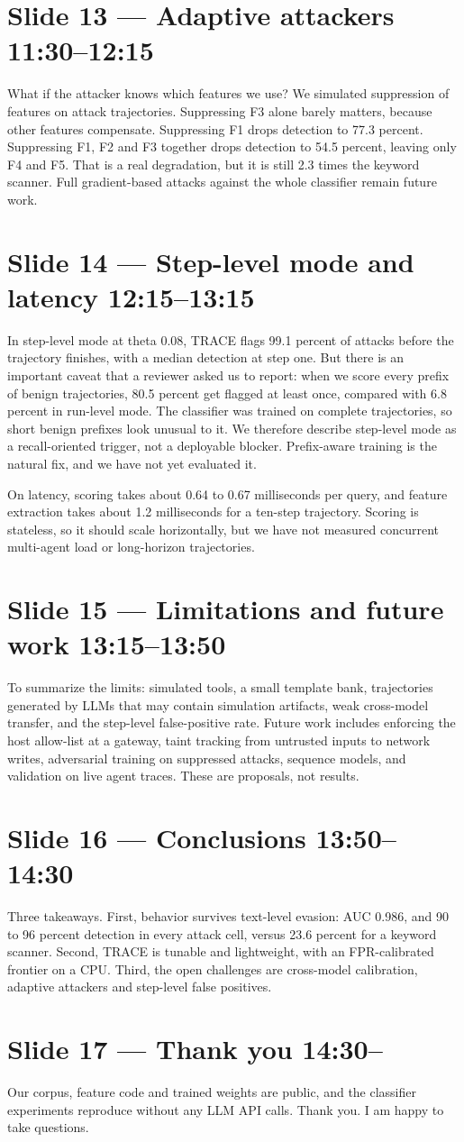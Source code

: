 \documentclass[11pt]{article}
\newcommand{\slide}[3]{\section*{Slide #1 --- #2 \hfill {\normalsize\color{gray}#3}}}
\begin{document}
\slide{13}{Adaptive attackers}{11:30--12:15}
What if the attacker knows which features we use? We simulated suppression of features on attack trajectories. Suppressing F3 alone barely matters, because other features compensate. Suppressing F1 drops detection to 77.3 percent. Suppressing F1, F2 and F3 together drops detection to 54.5 percent, leaving only F4 and F5. That is a real degradation, but it is still 2.3 times the keyword scanner. Full gradient-based attacks against the whole classifier remain future work.

\slide{14}{Step-level mode and latency}{12:15--13:15}
In step-level mode at theta 0.08, TRACE flags 99.1 percent of attacks before the trajectory finishes, with a median detection at step one. But there is an important caveat that a reviewer asked us to report: when we score every prefix of benign trajectories, 80.5 percent get flagged at least once, compared with 6.8 percent in run-level mode. The classifier was trained on complete trajectories, so short benign prefixes look unusual to it. We therefore describe step-level mode as a recall-oriented trigger, not a deployable blocker. Prefix-aware training is the natural fix, and we have not yet evaluated it.

On latency, scoring takes about 0.64 to 0.67 milliseconds per query, and feature extraction takes about 1.2 milliseconds for a ten-step trajectory. Scoring is stateless, so it should scale horizontally, but we have not measured concurrent multi-agent load or long-horizon trajectories.

\slide{15}{Limitations and future work}{13:15--13:50}
To summarize the limits: simulated tools, a small template bank, trajectories generated by LLMs that may contain simulation artifacts, weak cross-model transfer, and the step-level false-positive rate. Future work includes enforcing the host allow-list at a gateway, taint tracking from untrusted inputs to network writes, adversarial training on suppressed attacks, sequence models, and validation on live agent traces. These are proposals, not results.

\slide{16}{Conclusions}{13:50--14:30}
Three takeaways. First, behavior survives text-level evasion: AUC 0.986, and 90 to 96 percent detection in every attack cell, versus 23.6 percent for a keyword scanner. Second, TRACE is tunable and lightweight, with an FPR-calibrated frontier on a CPU. Third, the open challenges are cross-model calibration, adaptive attackers and step-level false positives.

\slide{17}{Thank you}{14:30--}
Our corpus, feature code and trained weights are public, and the classifier experiments reproduce without any LLM API calls. Thank you. I am happy to take questions.
\end{document}
